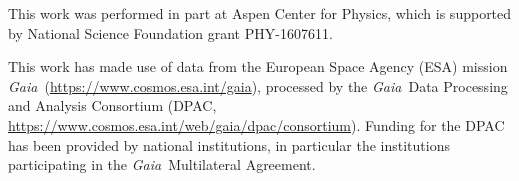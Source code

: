 \documentclass[12pt, modern]{aastex62}
\newcommand{\acronym}[1]{{\small{#1}}}
\newcommand{\Gaia}{\textsl{Gaia}}
\begin{document}
This work was performed in part at Aspen Center for Physics, which is supported by National Science Foundation grant PHY-1607611.

This work has made use of data from the European Space Agency (\acronym{ESA}) mission \Gaia\ (\url{https://www.cosmos.esa.int/gaia}), processed by the \Gaia\ Data Processing and Analysis Consortium (\acronym{DPAC}, \url{https://www.cosmos.esa.int/web/gaia/dpac/consortium}). Funding for the \acronym{DPAC} has been provided by national institutions, in particular the institutions participating in the \Gaia\ Multilateral Agreement.




\end{document}

